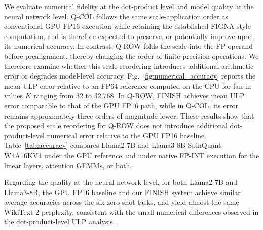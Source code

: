 \documentclass[sigconf,anonymous,nonacm]{acmart}
\newcommand{\ours}{\textsc{FINISH}}
\newcommand{\fpint}{FP-INT}
\begin{document}
We evaluate numerical fidelity at the dot-product level and model quality at the neural network level. Q-COL follows the same scale-application order as conventional GPU FP16 execution while retaining the established FIGNA-style computation, and is therefore expected to preserve, or potentially improve upon, its numerical accuracy. In contrast, Q-ROW folds the scale into the FP operand before prealignment, thereby changing the order of finite-precision operations. We therefore examine whether this scale reordering introduces additional arithmetic error or degrades model-level accuracy.
Fig.~\ref{fig:numerical_accuracy} reports the mean ULP error relative to an FP64 reference computed on the CPU for fan-in values $K$ ranging from 32 to 32,768. In Q-ROW, \ours{} achieves mean ULP error comparable to that of the GPU FP16 path, while in Q-COL, its error remains approximately three orders of magnitude lower. These results show that the proposed scale reordering for Q-ROW does not introduce additional dot-product-level numerical error relative to the GPU FP16 baseline.
Table~\ref{tab:accuracy} compares Llama2-7B and Llama3-8B SpinQuant W4A16KV4 under the GPU reference and under native \fpint{} execution for the linear layers, attention GEMMs, or both. 

Regarding the quality at the neural network level, for both Llama2-7B and Llama3-8B, the GPU FP16 baseline and our FINISH system achieve similar average accuracies across the six zero-shot tasks, and yield almost the same WikiText-2 perplexity, consistent with the small numerical differences observed in the dot-product-level ULP analysis.


\end{document}
